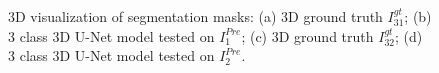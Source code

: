 \begin{figure}[!htb]
\centering
{}\hfil
{}

\hfil 
{}

\caption{3D visualization of segmentation masks: (a) 3D ground truth $I^{gt}_{31}$; (b) 3 class 3D U-Net model tested on $I^{Pre}_1$; (c) 3D ground truth $I^{gt}_{32}$; (d) 3 class 3D U-Net model tested on $I^{Pre}_2$.}

\label{fig:results-unet-3channel}

\end{figure}

